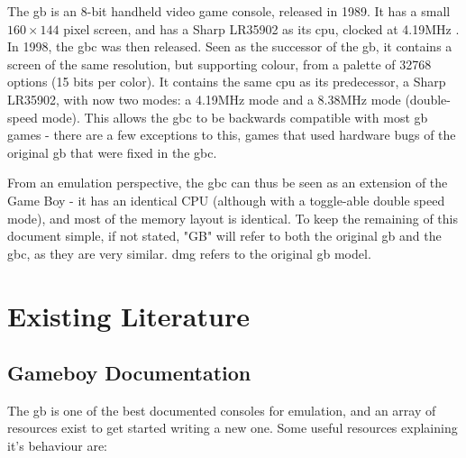 \documentclass[11pt]{report}
\begin{document}
The \gls{gb} is an 8-bit handheld video game console, released in 1989. It has a small $160 \times 144$ pixel screen, and has a Sharp LR35902 as its \gls{cpu}, clocked at 4.19MHz \cite[Specifications]{pandoc}. In 1998, the \gls{gbc} was then released. Seen as the successor of the \gls{gb}, it contains a screen of the same resolution, but supporting colour, from a palette of 32768 options (15 bits per color). It contains the same \gls{cpu} as its predecessor, a Sharp LR35902, with now two modes: a 4.19MHz mode and a 8.38MHz mode (double-speed mode). This allows the \gls{gbc} to be backwards compatible with most \gls{gb} games - there are a few exceptions to this, games that used hardware bugs of the original \gls{gb} that were fixed in the \gls{gbc}.

From an emulation perspective, the \glsdesc{gbc} can thus be seen as an extension of the Game Boy - it has an identical CPU (although with a toggle-able double speed mode), and most of the memory layout is identical. To keep the remaining of this document simple, if not stated, "GB" will refer to both the original \glsdesc{gb} and the \glsdesc{gbc}, as they are very similar. \gls{dmg} refers to the original \glsdesc{gb} model.

\section{Existing Literature}

\subsection{Gameboy Documentation}

The \glsdesc{gb} is one of the best documented consoles for emulation, and an array of resources exist to get started writing a new one. Some useful resources explaining it's behaviour are:
\end{document}
